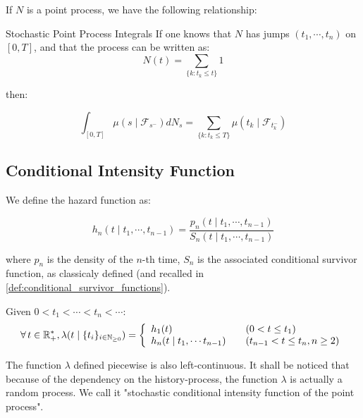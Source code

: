 \documentclass[11pt]{book}
\newcommand{\sequence}[1]{\{ #1 \}_{ i \in \N} }
\begin{document}
If $N$ is a point process, we have the following relationship:

\begin{theoreme}[label = eq:sum_prod_equiv]{Stochastic Point Process Integrals}
If one knows that $N$ has jumps $(t_1, \cdots, t_n)$ on $[0,T]$, and that the process can be written as:
\begin{equation}
N(t) = \sum_{ \{ k : t_k \leq t \} } 1 
\end{equation}

then:

\begin{equation}
\int_{[0,T]} \mu(s \mid \mathcal F_{s^-} ) d N_s = \sum_{ \{ k : t_k \leq T \} }\mu(t_k \mid \mathcal F_{t_k^-} ) 
\end{equation}  
\end{theoreme}


\subsection{Conditional Intensity Function}
We define the hazard function as:

$$h_n( t \mid t_1, \cdots, t_{n-1} ) = \frac{ p_n ( t \mid t_1, \cdots, t_{n-1} ) } { S_n ( t \mid t_1, \cdots, t_{n-1} ) }$$

where $p_n$ is the density of the $n$-th time, $S_n$ is the associated conditional survivor function, as classicaly defined (and recalled in \ref{def:conditional_survivor_functions}).


\begin{definition}
\label{def:lambda_1}
Given $0 < t_1 < \cdots < t_{n} < \cdots $:
\begin{equation}
\forall t \in \R_+^*, \lambda(t \mid \sequence{ t_i } ) = \left\{
    \begin{array}{ll}
            h_1(t) \quad & (0 < t \leq t_1) \\
            h_n(t \mid t_1, \cdots t_{n-1}) \quad & (t_{n-1} < t \leq t_n, n \geq 2) \\
    \end{array}
\right. 
\end{equation}

The function $\lambda$ defined piecewise is also left-continuous. It shall be noticed that because of the dependency on the history-process, the function $\lambda$ is actually a random process. We call it "stochastic conditional intensity function of the point process". 
\end{definition}
\end{document}
